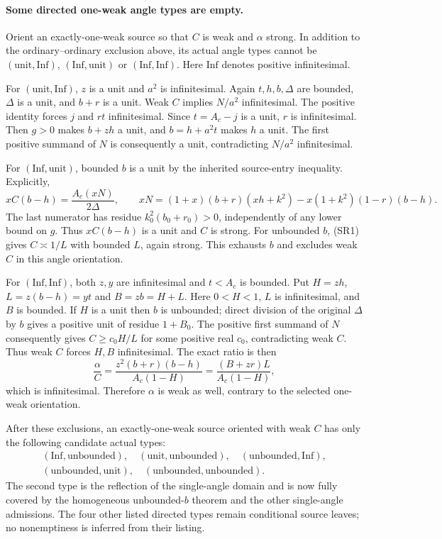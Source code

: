 \paragraph{Some directed one-weak angle types are empty.}
Orient an exactly-one-weak source so that $C$ is weak and $\alpha$
strong. In addition to the ordinary--ordinary exclusion above, its
actual angle types cannot be $(\mathrm{unit},\mathrm{Inf})$,
$(\mathrm{Inf},\mathrm{unit})$ or $(\mathrm{Inf},\mathrm{Inf})$.
Here $\mathrm{Inf}$ denotes positive infinitesimal.

For $(\mathrm{unit},\mathrm{Inf})$, $z$ is a unit and $a^2$ is
infinitesimal. Again $t,h,b,\Delta$ are bounded, $\Delta$ is a unit,
and $b+r$ is a unit. Weak $C$ implies $N/a^2$ infinitesimal.
The positive identity forces $j$ and $rt$ infinitesimal. Since
$t=A_c-j$ is a unit, $r$ is infinitesimal. Then $g>0$ makes
$b+zh$ a unit, and $b=h+a^2t$ makes $h$ a unit. The first positive
summand of $N$ is consequently a unit, contradicting $N/a^2$
infinitesimal.

For $(\mathrm{Inf},\mathrm{unit})$, bounded $b$ is a unit by the
inherited source-entry inequality. Explicitly,
\[
 xC(b-h)=\frac{A_c(xN)}{2\Delta},\qquad
 xN=(1+x)(b+r)(xh+k^2)-x(1+k^2)(1-r)(b-h).
\]
The last numerator has residue $k_0^2(b_0+r_0)>0$, independently
of any lower bound on $g$. Thus $xC(b-h)$ is a unit and $C$ is strong. For unbounded
$b$, (SR1) gives $C\asymp1/L$ with bounded $L$, again strong.
This exhausts $b$ and excludes weak $C$ in this angle orientation.

For $(\mathrm{Inf},\mathrm{Inf})$, both $z,y$ are infinitesimal
and $t<A_c$ is bounded. Put $H=zh$, $L=z(b-h)=yt$ and $B=zb=H+L$.
Here $0<H<1$, $L$ is infinitesimal, and $B$ is bounded. If $H$ is
a unit then $b$ is unbounded; direct division of the original
$\Delta$ by $b$ gives a positive unit of residue $1+B_0$.
The positive first summand of $N$ consequently gives
$C\ge c_0H/L$ for some positive real $c_0$, contradicting weak $C$.
Thus weak $C$ forces $H,B$ infinitesimal. The exact ratio is then
\[
 \frac\alpha C=
 \frac{z^2(b+r)(b-h)}{A_c(1-H)}
 =\frac{(B+zr)L}{A_c(1-H)},
\]
which is infinitesimal. Therefore $\alpha$ is weak as well, contrary
to the selected one-weak orientation.

After these exclusions, an exactly-one-weak source oriented with weak
$C$ has only the following candidate actual types:
\begin{gather*}
 (\mathrm{Inf},\mathrm{unbounded}),\quad
 (\mathrm{unit},\mathrm{unbounded}),\quad
 (\mathrm{unbounded},\mathrm{Inf}),\\
 (\mathrm{unbounded},\mathrm{unit}),\quad
 (\mathrm{unbounded},\mathrm{unbounded}).
\end{gather*}
The second type is the reflection of the single-angle domain and
is now fully covered by the homogeneous unbounded-$b$ theorem and the
other single-angle admissions. The four other listed directed types
remain conditional source leaves; no nonemptiness is inferred from
their listing.

